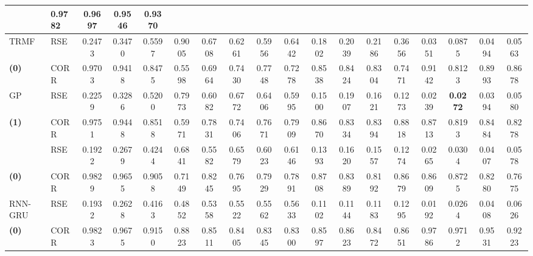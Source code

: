 \documentclass[sigconf]{acmart}
\begin{document}
\begin{table*}[!ht]
{\begin{tabular}{ll|cccc|cccc|cccc|cccc}
                            & 0.9782 & 0.9697 & \textbf{0.9546} & 0.9370 \\   
\midrule
\multirow{1}{*}{TRMF} & RSE 
							& 0.2473 & 0.3470 & 0.5597 & 0.9005 
                            & 0.6708 & 0.6261 & 0.5956 & 0.6442
                            & 0.1802 & 0.2039 & 0.2186 & 0.3656 
                            & 0.0351 & 0.0875 & 0.0494 & 0.0563 \\
\textbf{(0)}         & CORR 
                     		& 0.9703 & 0.9418 & 0.8475 & 0.5598
                            & 0.6964 & 0.7430 & 0.7748 & 0.7278 
                            & 0.8538 & 0.8424 & 0.8304 & 0.7471 
                            & 0.9142 & 0.8123 & 0.8993 & 0.8678 \\
\midrule
\multirow{1}{*}{GP} & RSE 
						  & 0.2259 & 0.3286 & 0.5200 & 0.7973
                          & 0.6082 & 0.6772 & 0.6406 & 0.5995
                          & 0.1500 & 0.1907 & 0.1621 & 0.1273 
                          & 0.0239 & \textbf{0.0272} & 0.0394 & 0.0580 \\
\textbf{(1)}              & CORR 
                   		  & 0.9751 & 0.9448 & 0.8518 & 0.5971
                          & 0.7831 & 0.7406 & 0.7671 & 0.7909
                          & 0.8670 & 0.8334 & 0.8394 & 0.8818
                          & 0.8713 & 0.8193 & 0.8484 & 0.8278\\
\midrule
{\multirow{1}{*}{VARMLP}} & RSE 
						 	   & 0.1922 & 0.2679 & 0.4244 & 0.6841 
                               & 0.5582 & 0.6579 & 0.6023 & 0.6146 
                               & 0.1393 & 0.1620 & 0.1557 & 0.1274
                               & 0.0265 & 0.0304 & 0.0407 & 0.0578\\
\textbf{(0)}                   & CORR 
                        	   & 0.9829 & 0.9655 & 0.9058 & 0.7149 
                               & 0.8245 & 0.7695 & 0.7929 & 0.7891
                               & 0.8708 & 0.8389 & 0.8192 & 0.8679
                               & 0.8609 & 0.8725 & 0.8280 & 0.7675 \\
\midrule 
\multirow{1}{*}{RNN-GRU}	& RSE 
							  & 0.1932 & 0.2628 & 0.4163 & 0.4852
							  & 0.5358 & 0.5522 & 0.5562 & 0.5633
                			  & 0.1102 & 0.1144 & 0.1183 & 0.1295
							  & 0.0192 & 0.0264 & 0.0408 & 0.0626 \\
\textbf{(0)}               & CORR 
                       		  & 0.9823 & 0.9675 & 0.9150 & 0.8823 
                              & 0.8511 & 0.8405 & 0.8345 & 0.8300
                              & 0.8597 & 0.8623 & 0.8472 & 0.8651
                              & 0.9786 & 0.9712 & 0.9531 & 0.9223 \\ 
                              

\end{tabular}}
\end{table*}
\end{document}
